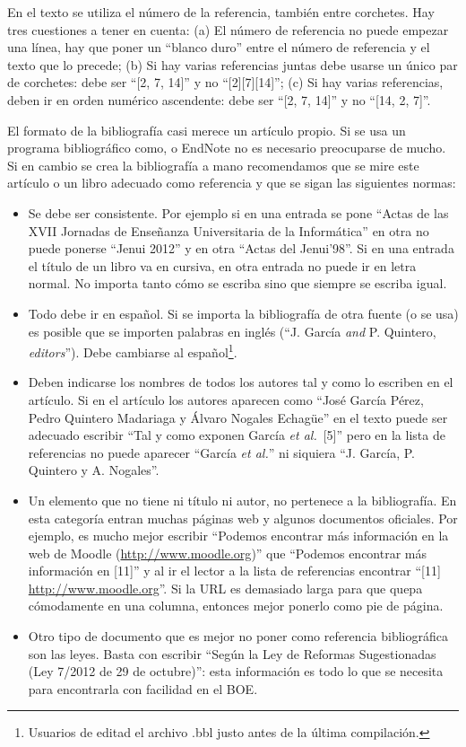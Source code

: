 \documentclass[twocolumn,twoside,a4paper, 10pt]{article}
\begin{document}
En el texto se utiliza el número de la referencia, también entre 
corchetes. Hay tres cuestiones a tener en cuenta: (a) El número de 
referencia no puede empezar una línea, hay que poner un ``blanco 
duro'' entre el número de referencia y el texto que lo precede; (b) 
Si hay varias referencias juntas debe usarse un único par de 
corchetes: debe ser ``[2, 7, 14]'' y no ``[2][7][14]''; (c) Si hay 
varias referencias, deben ir en orden numérico ascendente: debe ser  
``[2, 7, 14]'' y no ``[14, 2, 7]''.

El formato de la bibliografía casi merece un artículo propio. Si se 
usa un programa bibliográfico como, o EndNote no es necesario 
preocuparse de mucho. Si en cambio se crea la bibliografía a mano 
recomendamos que se mire este artículo o un libro adecuado como 
referencia y que se sigan las siguientes normas:
%
\begin{itemize}
	\item Se debe ser consistente.  Por ejemplo si en una entrada se
	pone ``Actas de las XVII Jornadas de Enseñanza Universitaria de la
	Informática'' en otra no puede ponerse ``Jenui 2012'' y en otra
	``Actas del Jenui'98''.  Si en una entrada el título de un libro
	va en cursiva, en otra entrada no puede ir en letra normal.  No
	importa tanto cómo se escriba sino que siempre se escriba igual.
	
	\item Todo debe ir en español.  Si se importa la bibliografía de
	otra fuente (o se usa) es posible que se importen palabras
	en inglés (``J. García \emph{and} P. Quintero, \emph{editors}'').
	Debe cambiarse al español\footnote{Usuarios de  editad el
	archivo .bbl justo antes de la última compilación.}.
	
	\item Deben indicarse los nombres de todos los autores tal y 
	como lo escriben en el artículo. Si en el artículo los autores 
	aparecen como ``José García Pérez, Pedro Quintero Madariaga y 
	\'Alvaro Nogales Echagüe'' en el texto puede ser adecuado escribir 
	``Tal y como exponen García \emph{et al.}~[5]'' pero en la lista 
	de referencias no puede aparecer ``García \emph{et al.}'' ni 
	siquiera ``J. García, P. Quintero y A. Nogales''. 
	
	\item Un elemento que no tiene ni título ni autor, no pertenece a 
	la bibliografía. En esta categoría entran muchas páginas web y 
	algunos documentos oficiales. Por ejemplo, es mucho mejor 
	escribir ``Podemos encontrar más información en la web de Moodle 
	(\url{http://www.moodle.org})'' que ``Podemos encontrar más 
	información en [11]'' y al ir el lector a la lista de referencias 
	encontrar ``[11] \url{http://www.moodle.org}''. Si la URL es demasiado 
	larga para que quepa cómodamente en una columna, entonces mejor 
	ponerlo como pie de página. 
	
	\item Otro tipo de documento que es mejor no poner como referencia 
	bibliográfica son las leyes. Basta con escribir ``Según la Ley de 
	Reformas Sugestionadas (Ley 7/2012 de 29 de octubre)'': esta 
	información es todo lo que se necesita para encontrarla con 
	facilidad en el BOE.
\end{itemize}
\end{document}

